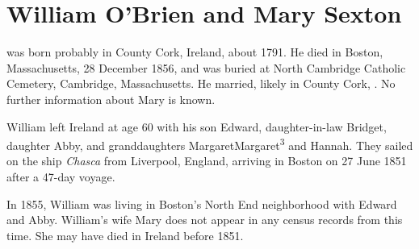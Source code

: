 \section{William O'Brien and Mary Sexton}

 was born probably in County Cork, Ireland, about 1791.\cite{Census1855William} He died in Boston, Massachusetts, 28 December 1856,\cite{William1OBrienDeath} and was buried at North Cambridge Catholic Cemetery, Cambridge, Massachusetts.\cite{DianaBerberenaLetter1} He married, likely in County Cork, .\cite{Michael2OBrienDeath,Abigail2OBrienDeath,Ann2OBrienDeath,Mary2OBrienDeath} No further information about Mary is known.

William left Ireland at age 60 with his son Edward, daughter-in-law Bridget, daughter Abby, and granddaughters MargaretMargaret\textsuperscript{3} and Hannah. They sailed on the ship \textit{Chasca}\cite{Chascay2} from Liverpool, England, arriving in Boston on 27 June 1851 after a 47-day voyage.\cite{Chascay}

In 1855, William was living in Boston's North End neighborhood with Edward and Abby.\cite{Census1855William,Wards} William's wife Mary does not appear in any census records from this time. She may have died in Ireland before 1851.

